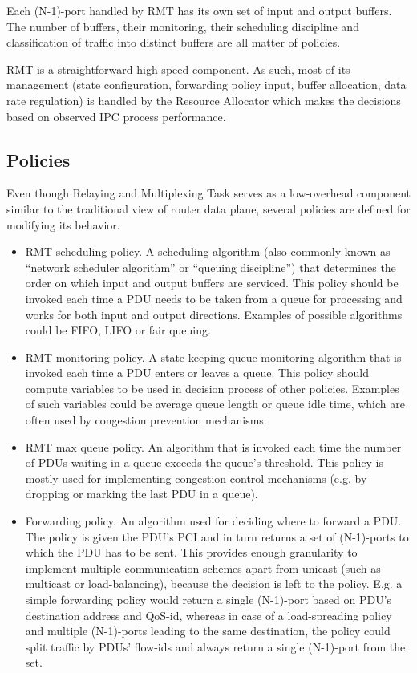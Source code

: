             Each (N-1)-port handled by RMT has its own set of input and output buffers. The number of buffers, their monitoring, their scheduling discipline and classification of traffic into distinct buffers are all matter of policies.

            RMT is a straightforward high-speed component. As such, most of its management (state configuration, forwarding policy input, buffer allocation, data rate regulation) is handled by the Resource Allocator which makes the decisions based on observed IPC process performance.


        \subsection{Policies}

            Even though Relaying and Multiplexing Task serves as a low-overhead component similar to the traditional view of router data plane, several policies are defined for modifying its behavior.

            \begin{itemize}
                \item RMT scheduling policy. A scheduling algorithm (also commonly known as ``network scheduler algorithm'' or ``queuing discipline'') that determines the order on which input and output buffers are serviced. This policy should be invoked each time a PDU needs to be taken from a queue for processing and works for both input and output directions. Examples of possible algorithms could be FIFO, LIFO or fair queuing.
                \item RMT monitoring policy. A state-keeping queue monitoring algorithm that is invoked each time a PDU enters or leaves a queue. This policy should compute variables to be used in decision process of other policies. Examples of such variables could be average queue length or queue idle time, which are often used by congestion prevention mechanisms.
                \item RMT max queue policy. An algorithm that is invoked each time the number of PDUs waiting in a queue exceeds the queue's threshold. This policy is mostly used for implementing congestion control mechanisms (e.g. by dropping or marking the last PDU in a queue).
                \item Forwarding policy. An algorithm used for deciding where to forward a PDU. The policy is given the PDU's PCI and in turn returns a set of (N-1)-ports to which the PDU has to be sent. This provides enough granularity to implement multiple communication schemes apart from unicast (such as multicast or load-balancing), because the decision is left to the policy. E.g. a simple forwarding policy would return a single (N-1)-port based on PDU's destination address and QoS-id, whereas in case of a load-spreading policy and multiple (N-1)-ports leading to the same destination, the policy could split traffic by PDUs' flow-ids and always return a single (N-1)-port from the set.
            \end{itemize}



